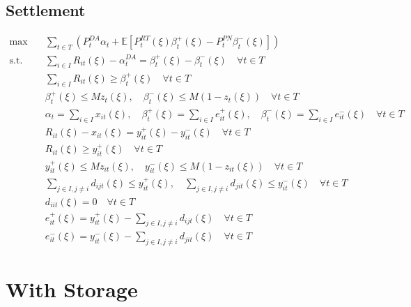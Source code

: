 \documentclass[10pt]{article}
\begin{document}
\subsection{Settlement}
\begin{subequations}
\begin{align}
    \text{max} \quad &\sum_{t\in T}\left(P_t^{DA}\alpha_t + \mathbb{E}\left[P_t^{RT}(\xi)\beta^+_{t}(\xi) - P_t^{PN}\beta^-_{t}(\xi)\right]\right) &\\
    \text{s.t.} \quad &\sum_{i\in I}R_{it}(\xi) - \alpha_{t}^{DA} = \beta_{t}^{+}(\xi) - \beta_{t}^{-}(\xi) \quad \forall t \in T &\\
    & \sum_{i\in I}R_{it}(\xi) \geq \beta^+_{t}(\xi) \quad \forall t \in T &\\
    & \beta_{t}^{+}(\xi) \leq M z_{t}(\xi), \quad \beta_{t}^{-}(\xi) \leq M (1 - z_{t}(\xi)) \quad \forall t\in T &\\
    & \alpha_t = \sum_{i \in I} x_{it}(\xi), \quad \beta^+_{t}(\xi) = \sum_{i \in I} e^+_{it}(\xi), \quad \beta^-_{t}(\xi) = \sum_{i \in I} e^-_{it}(\xi) \quad \forall t \in T &\\
    & R_{it}(\xi) - x_{it}(\xi) = y_{it}^{+}(\xi) - y_{it}^{-}(\xi) \quad  \forall t \in T &\\
    & R_{it}(\xi) \geq y^+_{it}(\xi) \quad \forall t \in T &\\
    & y_{it}^{+}(\xi) \leq M z_{it}(\xi), \quad y_{it}^{-}(\xi) \leq M (1 - z_{it}(\xi)) \quad \forall t \in T &\\
    & \sum_{j \in I, j \neq i} d_{ijt}(\xi) \leq y^+_{it}(\xi), \quad \sum_{j \in I, j \neq i} d_{jit}(\xi) \leq y^-_{it}(\xi) \quad \forall t \in T &\\
    & d_{iit}(\xi) = 0 \quad \forall t \in T &\\
    & e^+_{it}(\xi) = y^+_{it}(\xi) - \sum_{j \in I, j \neq i} d_{ijt}(\xi) \quad \forall t \in T &\\
    & e^-_{it}(\xi) = y^-_{it}(\xi) - \sum_{j \in I, j \neq i} d_{jit}(\xi) \quad \forall t \in T 
\end{align}
\end{subequations}

\newpage
\section{With Storage}
\end{document}
